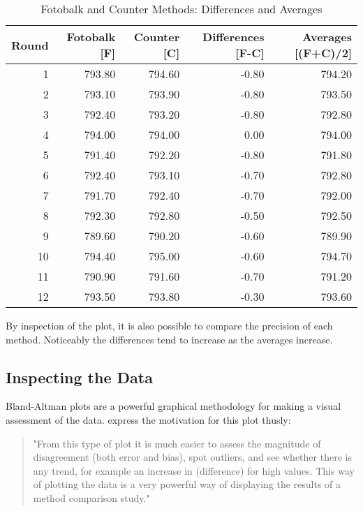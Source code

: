 \documentclass{report}
\begin{document}
\begin{table}[tbh]
	\begin{center}
		
		\begin{tabular}{rrrrr}
			\hline
			Round & Fotobalk [F] & Counter [C] & Differences [F-C] & Averages [(F+C)/2] \\
			\hline
			1 & 793.80 & 794.60 & -0.80 & 794.20 \\
			2 & 793.10 & 793.90 & -0.80 & 793.50 \\
			3 & 792.40 & 793.20 & -0.80 & 792.80 \\
			4 & 794.00 & 794.00 & 0.00 & 794.00 \\
			5 & 791.40 & 792.20 & -0.80 & 791.80 \\
			6 & 792.40 & 793.10 & -0.70 & 792.80 \\
			7 & 791.70 & 792.40 & -0.70 & 792.00 \\
			8 & 792.30 & 792.80 & -0.50 & 792.50 \\
			9 & 789.60 & 790.20 & -0.60 & 789.90 \\
			10 & 794.40 & 795.00 & -0.60 & 794.70 \\
			11 & 790.90 & 791.60 & -0.70 & 791.20 \\
			12 & 793.50 & 793.80 & -0.30 & 793.60 \\
			\hline
		\end{tabular}
		\caption{Fotobalk and Counter Methods: Differences and Averages}
	\end{center}
\end{table}



\newpage
By inspection of the plot, it is also possible to compare the
precision of each method. Noticeably the differences tend to
increase as the averages increase.

\subsection{Inspecting the Data}
Bland-Altman plots are a powerful graphical methodology for making
a visual assessment of the data. \citet*{BA83} express the
motivation for this plot thusly:
\begin{quote}
	"From this type of plot it is much easier to assess the magnitude
	of disagreement (both error and bias), spot outliers, and see
	whether there is any trend, for example an increase in
	(difference) for high values. This way of plotting the data is a
	very powerful way of displaying the results of a method comparison
	study."
\end{quote}
\end{document}
